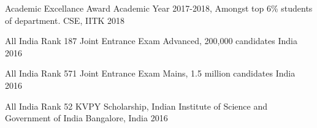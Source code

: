 
\begin{cvhonors}

  \cvhonor
    {Academic Excellance Award} %
    {Academic Year 2017-2018, Amongst top 6\% students of department.} %
    {CSE, IITK} %
    {2018} %

  \cvhonor
    {All India Rank 187} %
    {Joint Entrance Exam Advanced, 200,000 candidates} %
    {India} %
    {2016} %

  \cvhonor
    {All India Rank 571} %
    {Joint Entrance Exam Mains, 1.5 million candidates} %
    {India} %
    {2016} %

  \cvhonor
    {All India Rank 52} %
    {KVPY Scholarship, Indian Institute of Science and Government of India} %
    {Bangalore, India} %
    {2016} %

%

\end{cvhonors}
